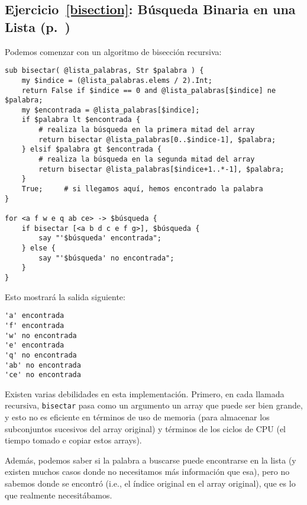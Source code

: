 \subsection{Ejercicio~\ref{bisection}: Búsqueda Binaria en una Lista (p.~\pageref{bisection})}
\label{sol_bisection}

Podemos comenzar con un algoritmo de bisección recursiva:


\begin{verbatim}
sub bisectar( @lista_palabras, Str $palabra ) {
    my $indice = (@lista_palabras.elems / 2).Int;
    return False if $indice == 0 and @lista_palabras[$indice] ne $palabra;
    my $encontrada = @lista_palabras[$indice];
    if $palabra lt $encontrada {
        # realiza la búsqueda en la primera mitad del array
        return bisectar @lista_palabras[0..$indice-1], $palabra;
    } elsif $palabra gt $encontrada {
        # realiza la búsqueda en la segunda mitad del array
        return bisectar @lista_palabras[$indice+1..*-1], $palabra;
    }
    True;     # si llegamos aquí, hemos encontrado la palabra
}

for <a f w e q ab ce> -> $búsqueda { 
    if bisectar [<a b d c e f g>], $búsqueda {
        say "'$búsqueda' encontrada";
    } else {
        say "'$búsqueda' no encontrada";
    }
}
\end{verbatim}

Esto mostrará la salida siguiente:
\begin{verbatim}
'a' encontrada
'f' encontrada
'w' no encontrada 
'e' encontrada
'q' no encontrada 
'ab' no encontrada 
'ce' no encontrada 
\end{verbatim}

Existen varias debilidades en esta implementación.
Primero, en cada llamada recursiva, {\tt bisectar}
pasa como un argumento un array que puede ser bien grande,
y esto no es eficiente en términos de uso de memoria
(para almacenar los subconjuntos sucesivos del array original)
y términos de los ciclos de CPU (el tiempo tomado e 
copiar estos arrays).


Además, podemos saber si la palabra a buscarse puede 
encontrarse en la lista (y existen muchos casos donde
no necesitamos más información que esa), pero no sabemos 
donde se encontró (i.e., el índice original en el array original),
que es lo que realmente necesitábamos.


